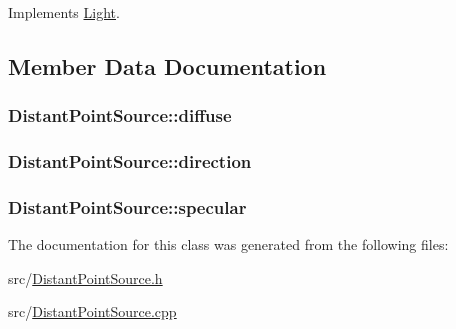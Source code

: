 Implements \hyperlink{classLight_a2a4cdf8081c2cab02757c2464610a32f}{Light}.



\subsection{Member Data Documentation}
\subsubsection[{\texorpdfstring{diffuse}{diffuse}}]{ Distant\+Point\+Source\+::diffuse\hspace{0.3cm}{\ttfamily [private]}}\hypertarget{classDistantPointSource_ab9a77355eb9d8fc8596d75c57de4fb5e}{}\label{classDistantPointSource_ab9a77355eb9d8fc8596d75c57de4fb5e}
\subsubsection[{\texorpdfstring{direction}{direction}}]{ Distant\+Point\+Source\+::direction\hspace{0.3cm}{\ttfamily [private]}}\hypertarget{classDistantPointSource_a8ed31d9e26d44381c1bd22b5f1b15c6c}{}\label{classDistantPointSource_a8ed31d9e26d44381c1bd22b5f1b15c6c}
\subsubsection[{\texorpdfstring{specular}{specular}}]{ Distant\+Point\+Source\+::specular\hspace{0.3cm}{\ttfamily [private]}}\hypertarget{classDistantPointSource_af6bebc971d66f68f97045712db771411}{}\label{classDistantPointSource_af6bebc971d66f68f97045712db771411}


The documentation for this class was generated from the following files\+:\begin{DoxyCompactItemize}
\item 
src/\hyperlink{DistantPointSource_8h}{Distant\+Point\+Source.\+h}\item 
src/\hyperlink{DistantPointSource_8cpp}{Distant\+Point\+Source.\+cpp}\end{DoxyCompactItemize}

